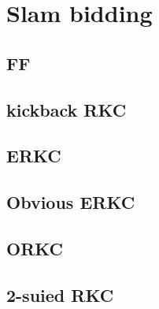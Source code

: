 \section{Slam bidding}

\subsection{FF}


\subsection{kickback RKC}


\subsection{ERKC}


\subsection{Obvious ERKC}


\subsection{ORKC}


\subsection{2-suied RKC}

